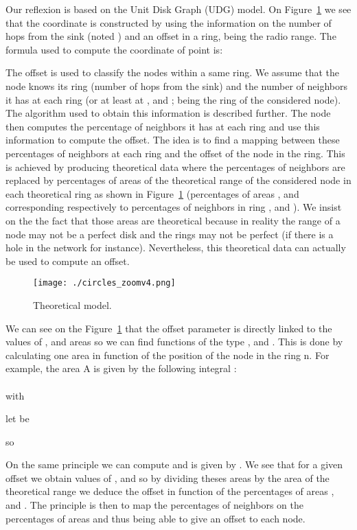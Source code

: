 \documentclass[a4paper]{article}
\begin{document}
Our reflexion is based on the Unit Disk Graph (UDG) model. On Figure~\ref{model}
 we see that the coordinate is constructed by using the information on the number of hops from the sink (noted ) and an offset in a ring,  being the radio range. The formula used to compute the coordinate of point  is:
 

The offset is used to classify the nodes within a same ring. We assume that the node knows its ring (number of hops from the sink) and the number of neighbors it has at each ring (or at least at ,  and ;  being the ring of the considered node). The algorithm used to obtain this information is described further. The node then computes the percentage of neighbors it has at each ring and use this information to compute the offset. The idea is to find a mapping between these percentages of neighbors at each ring and the offset of the node in the ring. This is achieved by producing theoretical data where the percentages of neighbors are replaced by percentages of areas of the theoretical range of the considered node in each theoretical ring as shown in Figure~\ref{model} 
(percentages of areas ,  and  corresponding respectively to percentages of neighbors in ring ,  and ). We insist on the the fact that those areas are theoretical because in reality the range of a node may not be a perfect disk and the rings may not be perfect (if there is a hole in the network for instance). Nevertheless, this theoretical data can actually be used to compute an offset.

\begin{figure}[!h]
  \centering
  \texttt{[image: ./circles\_zoomv4.png]}
  \caption{Theoretical model.}
  \label{model}
\end{figure}

We can see on the Figure~\ref{model} that the offset parameter is directly linked to the values of ,  and  areas so we can find functions of the type ,  and . This is done by calculating one area in function of the position of the node in the ring n. For example, the area A is given by the following integral : \\ \\


with


let  be
 


so






On the same principle we can compute  and  is given by . We see that for a given offset we obtain values of ,  and  so by dividing theses areas by the area of the theoretical range we deduce the offset in function of the percentages of areas ,  and . The principle is then to map the percentages of neighbors on the percentages of areas and thus being able to give an offset to each node.
\end{document}
